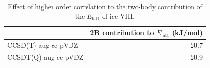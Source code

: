 \begin{table}[h]

\caption{\label{tab:tq_effect}Effect of higher order correlation to the two-body contribution of the $E_\text{latt}$ of ice VIII.}
\begin{tabular}{lr}
\toprule
 & 2B contribution to $E_\text{latt}$ (kJ/mol) \\ 
\midrule
CCSD(T) aug-cc-pVDZ & -20.7 \\
CCSDT(Q) aug-cc-pVDZ & -20.9 \\
\bottomrule
\end{tabular}

\end{table}